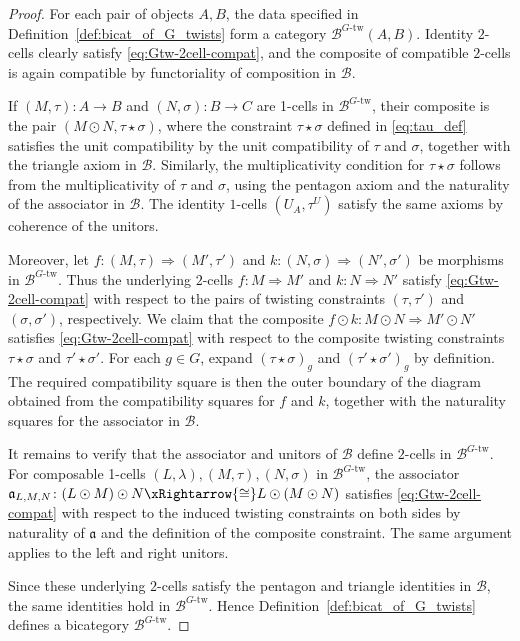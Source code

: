 \documentclass[11pt,oneside]{amsart}
\numberwithin{equation}{section}
\numberwithin{figure}{section}
\theoremstyle{plain}
\theoremstyle{definition}
\theoremstyle{remark}
\begin{document}
\begin{proof}
For each pair of objects \(A,B\), the data specified in
Definition~\ref{def:bicat_of_G_twists} form a category
\(\mathcal B^{G\text{-tw}}(A,B)\). Identity \(2\)-cells clearly satisfy
\eqref{eq:Gtw-2cell-compat}, and the composite of compatible \(2\)-cells is
again compatible by functoriality of composition in \(\mathcal B\).

If $(M,\tau):A\to B$ and $(N,\sigma):B\to C$ are 1-cells in $\mathcal{B}^{G\text{-tw}}$, their composite is the pair $(M\odot N, \tau\star\sigma)$, where the constraint $\tau\star\sigma$ defined in \eqref{eq:tau_def} satisfies the unit compatibility by the unit compatibility of $\tau$ and $\sigma$, together with the triangle axiom in $\mathcal{B}$. Similarly, the
multiplicativity condition for  $\tau\star\sigma$ follows from the
multiplicativity of \(\tau\) and \(\sigma\), using the pentagon axiom and the
naturality of the associator in \(\mathcal B\). The identity \(1\)-cells
\((U_A,\tau^U)\) satisfy the same axioms by coherence of the unitors.

Moreover, let
\(
f:(M,\tau)\Rightarrow (M',\tau')\) and \(
k:(N,\sigma)\Rightarrow (N',\sigma')
\)
be morphisms in \(\mathcal B^{G\text{-tw}}\). Thus the underlying
\(2\)-cells \(f:M\Rightarrow M'\) and \(k:N\Rightarrow N'\) satisfy
\eqref{eq:Gtw-2cell-compat} with respect to the pairs of twisting constraints
\((\tau,\tau')\) and \((\sigma,\sigma')\), respectively. We claim that the
 composite
\(
f\odot k:M\odot N\Rightarrow M'\odot N'
\)
satisfies \eqref{eq:Gtw-2cell-compat} with respect to the composite twisting
constraints \(\tau\star\sigma\) and \(\tau'\star\sigma'\). For each \(g\in G\),
expand \((\tau\star\sigma)_g\) and \((\tau'\star\sigma')_g\) by definition. The
required compatibility square is then the outer boundary of the  diagram
obtained from the compatibility squares for \(f\) and \(k\), together with the
naturality squares for the associator in \(\mathcal B\).

It remains to verify that the associator and unitors of \(\mathcal B\) define
\(2\)-cells in \(\mathcal B^{G\text{-tw}}\). For composable 1-cells
\(
(L,\lambda), (M,\tau), (N,\sigma)
\)
in $\mathcal B^{G\text{-tw}}$, the associator
\(
\mathfrak a_{L,M,N}\colon (L\odot M)\odot N \xRightarrow{\cong} L\odot(M\odot N)
\)
satisfies \eqref{eq:Gtw-2cell-compat} with respect to the induced twisting
constraints on both sides by naturality of \(\mathfrak a\) and the definition of
the composite constraint. The same argument applies to the left and right
unitors.

Since these underlying \(2\)-cells satisfy the pentagon and triangle identities
in \(\mathcal B\), the same identities hold in \(\mathcal B^{G\text{-tw}}\).
Hence Definition~\ref{def:bicat_of_G_twists} defines a bicategory
\(\mathcal B^{G\text{-tw}}\).
\end{proof}
\end{document}
